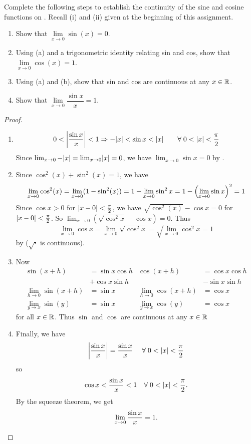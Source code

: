 \documentclass[12pt]{article}
\begin{document}
\begin{problem}
    Complete the following steps to establish the continuity of the sine and cosine functions on \R. Recall (i) and (ii) given at the beginning of this assignment.
    \begin{enumerate}[label=(\alph*)]
        \item Show that $\lim\limits_{x \to 0} \sin(x) = 0$.
        \item Using (a) and a trigonometric identity relating sin and cos, show that $\lim\limits_{x \to 0} \cos(x) = 1$.
        \item Using (a) and (b), show that sin and cos are continuous at any $x \in \mathbb{R}$.
        \item Show that $\lim\limits_{x \to 0} \dfrac{\sin x}{x} = 1$.
    \end{enumerate}
\end{problem}
\begin{proof} \leavevmode
    \begin{enumerate}[label=(\alph*)]
        \item \begin{equation*}
            0 < \abs{\frac{\sin x}{x}} < 1 \implies -\abs{x} < \sin x < \abs{x} \qquad\forall\; 0 < \abs{x} < \frac{\pi}{2}
        \end{equation*}
        Since $\lim_{x \to 0} -\abs{x} = \lim_{x \to 0} \abs{x} = 0$, we have $\lim_{x \to 0} \sin x = 0$ by .
        \item Since $\cos^{2}(x) + \sin^{2}(x) = 1$, we have \[
            \lim_{x \to 0} \cos^{2}(x) = \lim_{x \to 0}(1 - \sin^{2}(x)) = 1 - \lim_{x \to 0} \sin^{2} x = 1 - \paren{\lim_{x \to 0} \sin x}^{2} =  1
        \] Since $\cos x > 0$ for $\abs{x - 0} < \frac{\pi}{2}$, we have $\sqrt{\cos^{2} (x)} - \cos x = 0$ for $\abs{x - 0} < \frac{\pi}{2}$.
        So $\lim_{x \to 0} (\sqrt{\cos^{2}x} - \cos x) = 0$. Thus \[
            \lim_{x \to 0} \cos x = \lim_{x \to 0} \sqrt{\cos^{2} x} = \sqrt{\lim_{x \to 0} \cos^{2} x} = 1
        \] by  ($\sqrt{\cdot}$ is continuous).
        \item Now
        \begin{align*}
            \sin(x + h) &= \sin x \cos h & \cos(x + h) &= \cos x \cos h \\
            &+ \cos x \sin h &&- \sin x \sin h \\
            \lim_{h \to 0} \sin(x + h) &= \sin x & \lim_{h \to 0} \cos(x + h) &= \cos x \\
            \lim_{y \to x} \sin(y) &= \sin x & \lim_{y \to x} \cos(y) &= \cos x
        \end{align*} for all $x \in \mathbb{R}$. Thus $\sin$ and $\cos$ are continuous at any $x \in \mathbb{R}$
        \item Finally, we have \[
            \abs{\frac{\sin x}{x}} = \frac{\sin x}{x} \quad\;\forall\; 0 < \abs{x} < \frac{\pi}{2}
        \] so \[
            \cos x < \frac{\sin x}{x} < 1 \quad \forall\; 0 < \abs{x} < \frac{\pi}{2}.
        \] By the squeeze theorem, we get \[
            \lim_{x \to 0} \frac{\sin x}{x} = 1. \qedhere
        \]
    \end{enumerate}
\end{proof}
\end{document}
